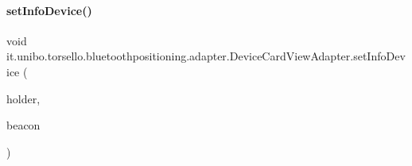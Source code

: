\paragraph{\texorpdfstring{set\+Info\+Device()}{setInfoDevice()}}
{\footnotesize\ttfamily void it.\+unibo.\+torsello.\+bluetoothpositioning.\+adapter.\+Device\+Card\+View\+Adapter.\+set\+Info\+Device (\begin{DoxyParamCaption}\item[{\hyperlink{classit_1_1unibo_1_1torsello_1_1bluetoothpositioning_1_1adapter_1_1DeviceCardViewAdapter_1_1DeviceViewHolder}{Device\+View\+Holder}}]{holder,  }\item[{Beacon}]{beacon }\end{DoxyParamCaption})\hspace{0.3cm}{\ttfamily [private]}}


